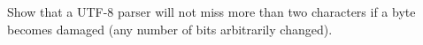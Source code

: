 Show that a UTF-8 parser will not miss more than two characters
if a byte becomes damaged (any number of bits arbitrarily changed).

